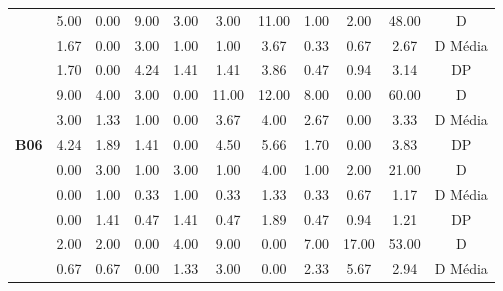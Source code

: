 \begin{table}[htbp]
\begin{tabular}{|c|c|c|c|c|c|c|c|c|cc}
		\rowcolor[HTML]{D9D9D9} 
		\cellcolor[HTML]{F2F2F2} & 5.00 & 0.00 & 9.00 & 3.00 & 3.00 & 11.00 & 1.00 & 2.00 & \multicolumn{1}{c|}{\cellcolor[HTML]{D9D9D9}48.00} & \multicolumn{1}{c|}{\cellcolor[HTML]{D9D9D9}D} \\ \cline{2-11} 
		\cellcolor[HTML]{F2F2F2} & 1.67 & 0.00 & 3.00 & 1.00 & 1.00 & 3.67 & 0.33 & 0.67 & \multicolumn{1}{c|}{2.67} & \multicolumn{1}{c|}{D Média} \\ \cline{2-11} 
		\rowcolor[HTML]{D9D9D9} 
		\multirow{-3}{*}{\cellcolor[HTML]{F2F2F2}\textbf{B05}} & 1.70 & 0.00 & 4.24 & 1.41 & 1.41 & 3.86 & 0.47 & 0.94 & \multicolumn{1}{c|}{\cellcolor[HTML]{D9D9D9}3.14} & \multicolumn{1}{c|}{\cellcolor[HTML]{D9D9D9}DP} \\ \hline
		\cellcolor[HTML]{F2F2F2} & 9.00 & 4.00 & 3.00 & 0.00 & 11.00 & 12.00 & 8.00 & 0.00 & \multicolumn{1}{c|}{60.00} & \multicolumn{1}{c|}{D} \\ \cline{2-11} 
		\rowcolor[HTML]{D9D9D9} 
		\cellcolor[HTML]{F2F2F2} & 3.00 & 1.33 & 1.00 & 0.00 & 3.67 & 4.00 & 2.67 & 0.00 & \multicolumn{1}{c|}{\cellcolor[HTML]{D9D9D9}3.33} & \multicolumn{1}{c|}{\cellcolor[HTML]{D9D9D9}D Média} \\ \cline{2-11} 
		\multirow{-3}{*}{\cellcolor[HTML]{F2F2F2}\textbf{B06}} & 4.24 & 1.89 & 1.41 & 0.00 & 4.50 & 5.66 & 1.70 & 0.00 & \multicolumn{1}{c|}{3.83} & \multicolumn{1}{c|}{DP} \\ \hline
		\rowcolor[HTML]{D9D9D9} 
		\cellcolor[HTML]{F2F2F2} & 0.00 & 3.00 & 1.00 & 3.00 & 1.00 & 4.00 & 1.00 & 2.00 & \multicolumn{1}{c|}{\cellcolor[HTML]{D9D9D9}21.00} & \multicolumn{1}{c|}{\cellcolor[HTML]{D9D9D9}D} \\ \cline{2-11} 
		\cellcolor[HTML]{F2F2F2} & 0.00 & 1.00 & 0.33 & 1.00 & 0.33 & 1.33 & 0.33 & 0.67 & \multicolumn{1}{c|}{1.17} & \multicolumn{1}{c|}{D Média} \\ \cline{2-11} 
		\rowcolor[HTML]{D9D9D9} 
		\multirow{-3}{*}{\cellcolor[HTML]{F2F2F2}\textbf{B08}} & 0.00 & 1.41 & 0.47 & 1.41 & 0.47 & 1.89 & 0.47 & 0.94 & \multicolumn{1}{c|}{\cellcolor[HTML]{D9D9D9}1.21} & \multicolumn{1}{c|}{\cellcolor[HTML]{D9D9D9}DP} \\ \hline
		\cellcolor[HTML]{F2F2F2} & 2.00 & 2.00 & 0.00 & 4.00 & 9.00 & 0.00 & 7.00 & 17.00 & \multicolumn{1}{c|}{53.00} & \multicolumn{1}{c|}{D} \\ \cline{2-11} 
		\rowcolor[HTML]{D9D9D9} 
		\cellcolor[HTML]{F2F2F2} & 0.67 & 0.67 & 0.00 & 1.33 & 3.00 & 0.00 & 2.33 & 5.67 & \multicolumn{1}{c|}{\cellcolor[HTML]{D9D9D9}2.94} & \multicolumn{1}{c|}{\cellcolor[HTML]{D9D9D9}D Média} \\ \cline{2-11} 

\end{tabular}
\end{table}
